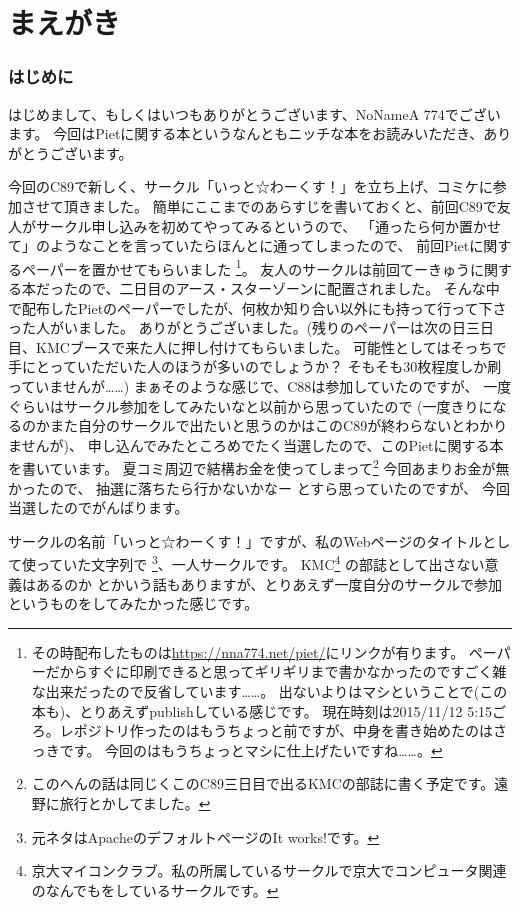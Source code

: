 \documentclass[twocolumn,12pt,b5book]{extarticle}
\begin{document}

\cleardoublepage
\tableofcontents

\cleardoublepage



\part{まえがき}
\section{はじめに}
はじめまして、もしくはいつもありがとうございます、NoNameA 774でございます。
今回はPietに関する本というなんともニッチな本をお読みいただき、ありがとうございます。

今回のC89で新しく、サークル「いっと☆わーくす！」を立ち上げ、コミケに参加させて頂きました。
簡単にここまでのあらすじを書いておくと、前回C89で友人がサークル申し込みを初めてやってみるというので、
「通ったら何か置かせて」のようなことを言っていたらほんとに通ってしまったので、
前回Pietに関するペーパーを置かせてもらいました
\footnote{その時配布したものは\url{https://nna774.net/piet/}にリンクが有ります。
ペーパーだからすぐに印刷できると思ってギリギリまで書かなかったのですごく雑な出来だったので反省しています……。
出ないよりはマシということで(この本も)、とりあえずpublishしている感じです。
現在時刻は2015/11/12 5:15ごろ。レポジトリ作ったのはもうちょっと前ですが、中身を書き始めたのはさっきです。
今回のはもうちょっとマシに仕上げたいですね……。}。
友人のサークルは前回てーきゅうに関する本だったので、二日目のアース・スターゾーンに配置されました。
そんな中で配布したPietのペーパーでしたが、何枚か知り合い以外にも持って行って下さった人がいました。
ありがとうございました。(残りのペーパーは次の日三日目、KMCブースで来た人に押し付けてもらいました。
可能性としてはそっちで手にとっていただいた人のほうが多いのでしょうか？ そもそも30枚程度しか刷っていませんが……)
まぁそのような感じで、C88は参加していたのですが、
一度ぐらいはサークル参加をしてみたいなと以前から思っていたので
(一度きりになるのかまた自分のサークルで出たいと思うのかはこのC89が終わらないとわかりませんが)、
申し込んでみたところめでたく当選したので、このPietに関する本を書いています。
夏コミ周辺で結構お金を使ってしまって\footnote{このへんの話は同じくこのC89三日目で出るKMCの部誌に書く予定です。遠野に旅行とかしてました。}
今回あまりお金が無かったので、
抽選に落ちたら行かないかなー とすら思っていたのですが、
今回当選したのでがんばります。

サークルの名前「いっと☆わーくす！」ですが、私のWebページのタイトルとして使っていた文字列で
\footnote{元ネタはApacheのデフォルトページのIt works!です。}、一人サークルです。
KMC\footnote{京大マイコンクラブ。私の所属しているサークルで京大でコンピュータ関連のなんでもをしているサークルです。}
の部誌として出さない意義はあるのか とかいう話もありますが、とりあえず一度自分のサークルで参加というものをしてみたかった感じです。
\end{document}
